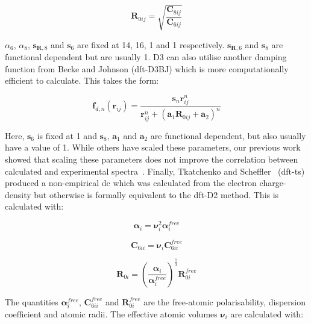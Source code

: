 \begin{equation}
\boldsymbol{R}_{0ij} = \sqrt{\frac{\boldsymbol{C}_{8ij}}{\boldsymbol{C}_{6ij}}}
\end{equation}

\({\alpha}_{6}\), \({\alpha}_{8}\), \(\boldsymbol{s}_{\boldsymbol{R},8}\) and \(\boldsymbol{s}_6\) are fixed at 14, 16, 1 and 1 respectively. \(\boldsymbol{s}_{\boldsymbol{R},6}\) and \(\boldsymbol{s}_8\) are functional dependent but are usually 1. D3 can also utilise another damping function from Becke and Johnson\cite{Becke2005} (\acrshort{dft}\nobreakdash-D3BJ) which is more computationally efficient to calculate. This takes the form:

\begin{equation}
\boldsymbol{f}_{d,n}(\boldsymbol{r}_{ij}) = \frac{\boldsymbol{s}_n \boldsymbol{r}_{ij}^n} {\boldsymbol{r}_{ij}^n + (\boldsymbol{a}_1 \boldsymbol{R}_{0ij} + \boldsymbol{a}_2)^n}
\end{equation}

Here, \(\boldsymbol{s}_6\) is fixed at 1 and \(\boldsymbol{s}_8\), \(\boldsymbol{a}_1\) and \(\boldsymbol{a}_2\) are functional dependent, but also usually have a value of 1. While others have scaled these parameters, our previous work showed that scaling these parameters does not improve the correlation between calculated and experimental spectra~\cite{Kendrick2020}.  Finally, Tkatchenko and Scheffler~\cite{Tkatchenko2009} (\acrshort{dft}-\acrshort{ts}) produced a non-empirical \acrshort{dc} which was calculated from the electron charge\nobreakdash-density but otherwise is formally equivalent to the \acrshort{dft}\nobreakdash-D2 method. This is calculated with:

\begin{equation}
\boldsymbol{\alpha}_i = \boldsymbol{\nu}_i^2 \boldsymbol{\alpha}_i^{free}
\end{equation}

\begin{equation}
\boldsymbol{C}_{6ii} = \boldsymbol{\nu}_i \boldsymbol{C}_{6ii}^{free}
\end{equation}

\begin{equation}
\boldsymbol{R}_{0i} = \left(\frac{\boldsymbol{\alpha}_i}{\boldsymbol{\alpha}_i^{free}}\right)^{\frac{1}{3}} \boldsymbol{R}_{0i}^{free}
\end{equation}

The quantities \( \boldsymbol{\alpha}_i^{free} \), \( \boldsymbol{C}_{6ii}^{free} \) and \( \boldsymbol{R}_{0i}^{free} \) are the free-atomic polarisability, dispersion coefficient and atomic radii. The effective atomic volumes \( \boldsymbol{\nu}_i \) are calculated with:

